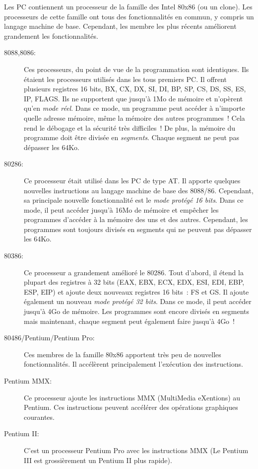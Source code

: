 Les PC contiennent un processeur de la famille des Intel 80x86 (ou un clone).
Les processeurs de cette famille ont tous des fonctionnalités en commun,
y compris un langage machine de base. Cependant, les membre les plus
récents améliorent grandement les fonctionnalités.
\begin{description}

\item[8088,8086:] Ces processeurs, du point de vue de la programmation
sont identiques. Ils étaient les processeurs utilisés dans les tous premiers
PC. Il offrent plusieurs registres 16 bits, BX, CX, DX, SI, DI, BP, SP,
CS, DS, SS, ES, IP, FLAGS. Ils ne supportent que jusqu'à 1Mo de mémoire
et n'opèrent qu'en \emph{mode réel}.  Dans ce mode, un programme peut
accéder à n'importe quelle adresse mémoire, même la mémoire des autres
programmes~! Cela rend le débogage et la sécurité très difficiles~! De plus,
la mémoire du programme doit être divisée en \emph{segments}. Chaque segment
ne peut pas dépasser les 64Ko.

\item[80286:] Ce processeur était utilisé dans les PC de type AT. Il apporte
quelques nouvelles instructions au langage machine de base des 8088/86. 
Cependant, sa principale nouvelle fonctionnalité est le 
\emph{mode protégé 16 bits}. Dans ce mode, il peut accéder jusqu'à 16Mo de mémoire
et empêcher les programmes d'accéder à la mémoire des uns et des autres.
Cependant, les programmes sont toujours divisés en segments qui ne peuvent pas
dépasser les 64Ko.

\item[80386:] Ce processeur a grandement amélioré le 80286. Tout d'abord,
il étend la plupart des registres à 32 bits (EAX, EBX, ECX, EDX, ESI, EDI, EBP, ESP,
EIP) et ajoute deux nouveaux registres 16 bits~: FS et GS. Il ajoute également un
nouveau \emph{mode protégé 32 bits}. Dans ce mode, il peut accéder jusqu'à 4Go
de mémoire. Les programmes sont encore divisés en segments mais maintenant,
chaque segment peut également faire jusqu'à 4Go~!

\item[80486/Pentium/Pentium Pro:] Ces membres de la famille 80x86 apportent
très peu de nouvelles fonctionnalités. Il accélèrent principalement l'exécution
des instructions.

\item[Pentium MMX:] Ce processeur ajoute les instructions MMX (MultiMedia eXentions)
au Pentium. Ces instructions peuvent accélérer des opérations graphiques courantes.

\item[Pentium II:] C'est un processeur Pentium Pro avec les instructions MMX
(Le Pentium III est grossièrement un Pentium II plus rapide).

\end{description}

